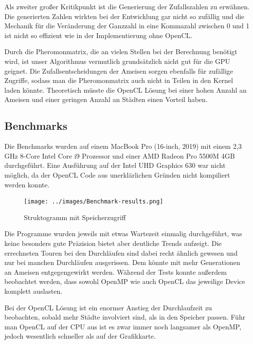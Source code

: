 Als zweiter großer Kritikpunkt ist die Generierung der Zufallszahlen zu erwähnen. 
Die generierten Zahlen wirkten bei der Entwicklung gar nicht so zufällig und die Mechanik für die Veränderung der Ganzzahl in eine Kommazahl zwischen 0 und 1 ist nicht so effizient wie in der Implementierung ohne OpenCL.

Durch die Pheromonmatrix, die an vielen Stellen bei der Berechnung benötigt wird, ist unser Algorithmus vermutlich grundsätzlich nicht gut für die GPU geignet.
Die Zufallsentscheidungen der Ameisen sorgen ebenfalls für zufällige Zugriffe, sodass man die Pheromonmatrix auch nicht in Teilen in den Kernel laden könnte.
Theoretisch müsste die OpenCL Lösung bei einer hohen Anzahl an Ameisen und einer geringen Anzahl an Städten einen Vorteil haben.


\subsection{Benchmarks}

Die Benchmarks wurden auf einem MacBook Pro (16-inch, 2019) mit einem 2,3 GHz 8-Core Intel Core i9 Prozessor und einer AMD Radeon Pro 5500M 4GB durchgeführt.
Eine Ausführung auf der Intel UHD Graphics 630 war nicht möglich, da der OpenCL Code aus unerklärlichen Gründen nicht kompiliert werden konnte.

\begin{figure}[h]
    \centering
    \texttt{[image: ../images/Benchmark-results.png]}
    \caption{Struktogramm mit Speicherzugriff}
    \label{fig:benchmark-results}
\end{figure}

Die Programme wurden jeweils mit etwas Wartezeit einmalig durchgeführt, was keine besonders gute Präzision bietet aber deutliche Trends aufzeigt.
Die errechneten Touren bei den Durchläufen sind dabei recht ähnlich gewesen und nur bei manchen Durchläufen ausgerissen. 
Dem könnte mit mehr Generationen an Ameisen entgegengewirkt werden. 
Während der Tests konnte außerdem beobachtet werden, dass sowohl OpenMP wie auch OpenCL das jeweilige Device komplett auslasten.

Bei der OpenCL Lösung ist ein enormer Anstieg der Durchlaufzeit zu beobachten, sobald mehr Städte involviert sind, als in den Speicher passen.
Führ man OpenCL auf der CPU aus ist es zwar immer noch langsamer als OpenMP, jedoch wesentlich schneller als auf der Grafikkarte. 